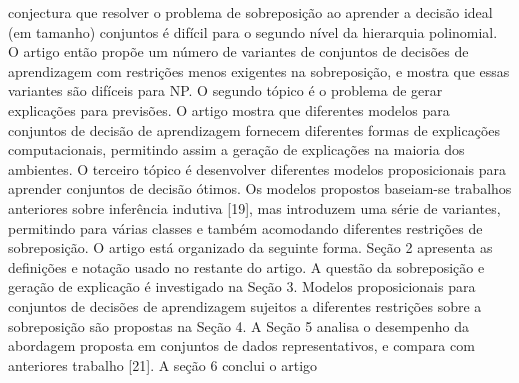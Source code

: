\documentclass[a4paper, 12 pt]{article}
\begin{document}
conjectura que resolver o problema de sobreposição ao aprender a decisão ideal (em tamanho)
conjuntos é difícil para o segundo nível da hierarquia polinomial. O artigo então propõe um
número de variantes de conjuntos de decisões de aprendizagem com restrições menos exigentes na sobreposição,
e mostra que essas variantes são difíceis para NP. O segundo tópico é o problema
de gerar explicações para previsões. O artigo mostra que diferentes modelos para
conjuntos de decisão de aprendizagem fornecem diferentes formas de explicações computacionais, permitindo assim
a geração de explicações na maioria dos ambientes. O terceiro tópico é desenvolver diferentes
modelos proposicionais para aprender conjuntos de decisão ótimos. Os modelos propostos baseiam-se
trabalhos anteriores sobre inferência indutiva [19], mas introduzem uma série de variantes, permitindo
para várias classes e também acomodando diferentes restrições de sobreposição. 
O artigo está organizado da seguinte forma. Seção 2 apresenta as definições e notação
usado no restante do artigo. A questão da sobreposição e geração de explicação
é investigado na Seção 3. Modelos proposicionais para conjuntos de decisões de aprendizagem sujeitos a
diferentes restrições sobre a sobreposição são propostas na Seção 4. A Seção 5 analisa o desempenho
da abordagem proposta em conjuntos de dados representativos, e compara com anteriores
trabalho [21]. A seção 6 conclui o artigo
\end{document}
